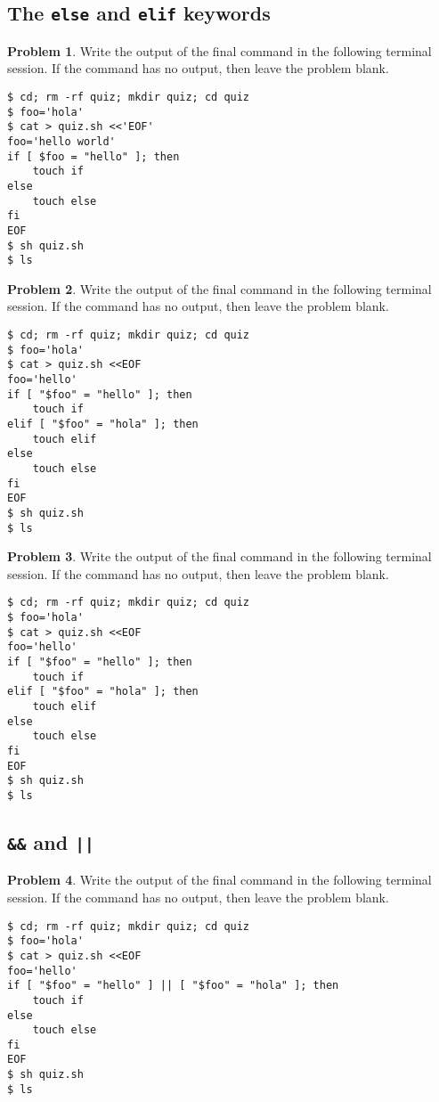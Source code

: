 \documentclass[10pt]{article}
\theoremstyle{definition}
\newtheorem{problem}{Problem}
\begin{document}
\filbreak
\subsection{The \lstinline{else} and \lstinline{elif} keywords}

\begin{problem}
    Write the output of the final command in the following terminal session.
    If the command has no output, then leave the problem blank.
\end{problem}
\begin{lstlisting}
$ cd; rm -rf quiz; mkdir quiz; cd quiz
$ foo='hola'
$ cat > quiz.sh <<'EOF'
foo='hello world'
if [ $foo = "hello" ]; then
    touch if
else
    touch else
fi
EOF
$ sh quiz.sh
$ ls
\end{lstlisting}


\filbreak
\begin{problem}
    Write the output of the final command in the following terminal session.
    If the command has no output, then leave the problem blank.
\end{problem}
\begin{lstlisting}
$ cd; rm -rf quiz; mkdir quiz; cd quiz
$ foo='hola'
$ cat > quiz.sh <<EOF
foo='hello'
if [ "$foo" = "hello" ]; then
    touch if
elif [ "$foo" = "hola" ]; then
    touch elif
else
    touch else
fi
EOF
$ sh quiz.sh
$ ls
\end{lstlisting}


\filbreak
\begin{problem}
    Write the output of the final command in the following terminal session.
    If the command has no output, then leave the problem blank.
\end{problem}
\begin{lstlisting}
$ cd; rm -rf quiz; mkdir quiz; cd quiz
$ foo='hola'
$ cat > quiz.sh <<EOF
foo='hello'
if [ "$foo" = "hello" ]; then
    touch if
elif [ "$foo" = "hola" ]; then
    touch elif
else
    touch else
fi
EOF
$ sh quiz.sh
$ ls
\end{lstlisting}


\filbreak
\subsection{\lstinline{&&} and \lstinline{||}}


\filbreak
\begin{problem}
    Write the output of the final command in the following terminal session.
    If the command has no output, then leave the problem blank.
\end{problem}
\begin{lstlisting}
$ cd; rm -rf quiz; mkdir quiz; cd quiz
$ foo='hola'
$ cat > quiz.sh <<EOF
foo='hello'
if [ "$foo" = "hello" ] || [ "$foo" = "hola" ]; then
    touch if
else
    touch else
fi
EOF
$ sh quiz.sh
$ ls
\end{lstlisting}
\end{document}
